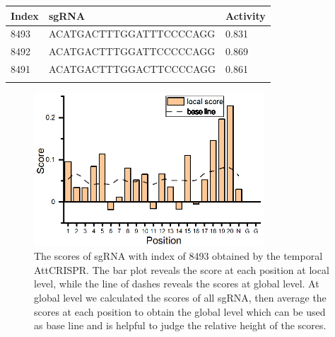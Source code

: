 \documentclass{bioinfo}
\begin{document}
\begin{table}[!tpb]
    {\begin{tabular}{@{}lll@{}}\toprule
        Index & sgRNA & Activity \\\midrule
        8493 & ACATGACTTTGGATTTCCCCAGG & 0.831\\
        8492 & ACATGACTTTGGATTCCCCCAGG & 0.869\\
        8491 & ACATGACTTTGGACTTCCCCAGG & 0.861\\
        \botrule
    \end{tabular}}\footnotesize{}
\end{table}
\begin{figure}[!tpb]
    \centerline{\includegraphics[width=86mm]{local0.eps}}
    \caption{
The scores of sgRNA with index of 8493 obtained by the temporal AttCRISPR. 
The bar plot reveals the score at each position at local level, while the line of dashes reveals the scores at global level. 
At global level we calculated the scores of all sgRNA, then average the scores at each position to obtain the global level which can be used as base line and is helpful to judge the relative height of the scores. 
}\label{fig:opt}
\end{figure}
\end{document}
